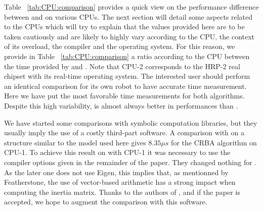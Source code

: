 Table ~\ref{tab:CPU:comparison} provides a quick view on the performance difference between \softmetapod and \softrbdl on various CPUs.
The next section will detail some aspects related to the CPUs which will try to explain that the values provided
here are to be taken cautiously and are likely to highly vary according to the CPU, the context of its overload,
the compiler and the operating system. For this reason, we provide in Table ~\ref{tab:CPU:comparison} a ratio
according to the CPU between the time provided by \softmetapod and \softrbdl. 
Note that CPU-2 corresponds to the HRP-2 real chipset with its real-time operating system. The interested user
should perform an identical comparison for its own robot to have accurate time measurement. 
Here we have put the most favorable time measurements for both algorithms.
Despite this high variability, \softmetapod is almost always better in performances than \softrbdl.

We have started some comparisons with symbolic computation libraries, but they usually imply
the use of a costly third-part software. A comparison with \softhumans on a structure similar to the model
used here gives $8.35 \mu s$ for the CRBA algorithm on CPU-1. To achieve this result on \softmetapod with CPU-1 it was necessary
to use the compiler options given in the remainder of the paper. They changed nothing for \softhumans.
As the later one does not use Eigen, this implies that, as mentionned by Featherstone, the use of
vector-based arithmetic has a strong impact when computing the inertia matrix.
Thanks to the authors of \softsymoro, and if the paper is accepted, we hope to augment the comparison with this software.

